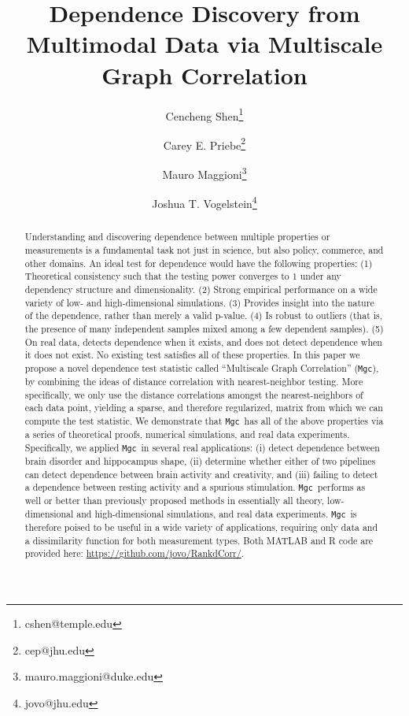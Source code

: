 \documentclass[11pt]{article}
\providecommand{\sct}[1]{{\sc \texttt{#1}}}
\newcommand{\Mgc}{\sct{Mgc}}
\newcommand{\website}{\url{https://github.com/jovo/RankdCorr/}}
\begin{document}
\def\spacingset#1{\renewcommand{\baselinestretch}%
{#1}\small\normalsize} \spacingset{1}

\title{\bf Dependence Discovery from Multimodal Data via  Multiscale Graph Correlation}
\author[1]{Cencheng Shen\thanks{cshen@temple.edu}}
\author[2]{Carey E. Priebe\thanks{cep@jhu.edu}}
\author[3]{Mauro Maggioni\thanks{mauro.maggioni@duke.edu}}
\author[4]{Joshua T. Vogelstein\thanks{jovo@jhu.edu}}
\maketitle
\pagestyle{empty}

\bigskip
\begin{abstract}
Understanding and discovering dependence between multiple properties or measurements is a fundamental task not just in science, but also policy, commerce, and other domains. 
An ideal test for dependence would have the following properties:
(1) Theoretical consistency such that the testing power converges to $1$ under any dependency structure and dimensionality. 
(2) Strong empirical performance on a wide variety of low- and high-dimensional simulations. 
(3) Provides insight into the nature of the dependence, rather than merely a valid p-value. 
(4) Is robust to outliers (that is, the presence of many independent samples mixed among a few dependent samples).
(5) On real data, detects dependence when it exists, and does not detect dependence when it does not exist. 
No existing test satisfies all of these properties. 
In this paper we propose a novel dependence test statistic called ``Multiscale Graph Correlation'' (\Mgc), by combining the ideas of distance correlation with nearest-neighbor testing.  
More specifically, we only use the distance correlations amongst the nearest-neighbors of each data point, yielding a sparse, and therefore regularized, matrix from which we can compute the test statistic.
We demonstrate that \Mgc~has all of the above properties via a series of theoretical proofs, numerical simulations, and real data experiments.  Specifically, we applied \Mgc~in several real applications: (i) detect dependence between brain disorder and hippocampus shape, (ii) determine whether either of two pipelines can detect dependence between brain activity and creativity, and (iii) failing to detect a dependence between resting activity and a spurious stimulation.  \Mgc~performs as well or better than previously proposed methods in essentially all theory, low-dimensional and high-dimensional simulations, and real data experiments.  \Mgc~is therefore poised to be useful in a wide variety of applications, requiring only data and a dissimilarity function for both measurement types.  Both MATLAB and R code are provided here: \website. 
\end{abstract}
\end{document}
